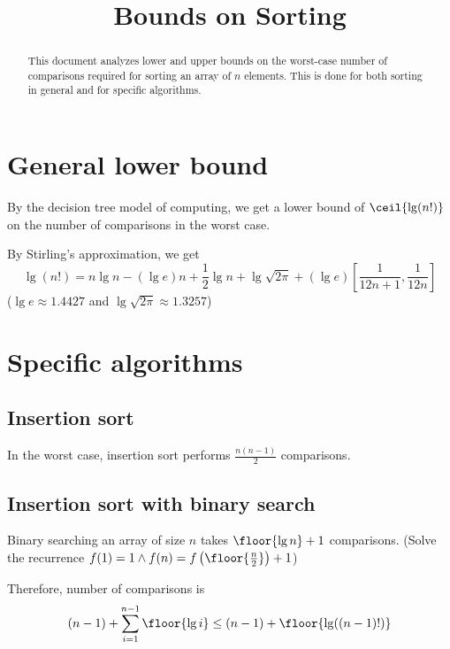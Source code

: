 

\title{Bounds on Sorting}



\maketitle

\begin{abstract}
This document analyzes lower and upper bounds on the worst-case number of comparisons required for sorting
an array of $n$ elements. This is done for both sorting in general and for specific algorithms.
\end{abstract}

\initFromContents{}

\section{General lower bound}

By the decision tree model of computing, we get a lower bound of $\ceil{\lg(n!)}$
on the number of comparisons in the worst case.

By Stirling's approximation, we get
\[ \lg(n!) = n\lg n - (\lg e)n + \frac{1}{2}\lg n + \lg\sqrt{2\pi}
+ (\lg e)\left[ \frac{1}{12n+1}, \frac{1}{12n} \right] \]
($\lg e \approx 1.4427$ and $\lg\sqrt{2\pi} \approx 1.3257$)

\section{Specific algorithms}

\subsection{Insertion sort}

In the worst case, insertion sort performs $\frac{n(n-1)}{2}$ comparisons.

\subsection{Insertion sort with binary search}

Binary searching an array of size $n$ takes $\floor{\lg n} + 1$ comparisons.
(Solve the recurrence $f(1) = 1 \wedge f(n) = f\left(\floor{\frac{n}{2}}\right) + 1$)

Therefore, number of comparisons is
\[ (n-1) + \sum_{i=1}^{n-1} \floor{\lg i} \le (n-1) + \floor{\lg((n-1)!)} \]

